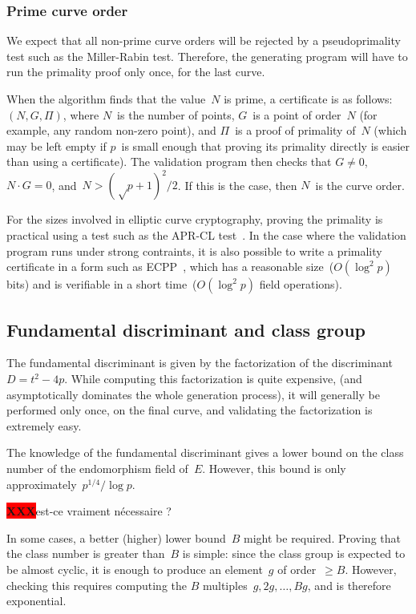 \documentclass{article}
\def\XXX{{\colorbox{red}{{\color{white}\bfseries XXX}}}}
\begin{document}
\subsubsection{Prime curve order}
We expect that all non-prime curve orders
will be rejected by a pseudoprimality test such as the Miller-Rabin test.
Therefore, the generating program will have to run the primality proof
only once, for the last curve.

When the algorithm finds that the value~$N$ is prime,
a certificate is as follows: $(N, G, Π)$,
where $N$~is the number of points,
$G$~is a point of order~$N$ (for example, any random non-zero point),
and $Π$~is a proof of primality of~$N$
(which may be left empty if $p$~is small enough
that proving its primality directly is easier than using a certificate).
The validation program then checks that $G ≠ 0$,
$N · G = 0$, and~$N > (√p+1)^2 / 2$.
If this is the case, then $N$~is the curve order.

For the sizes involved in elliptic curve cryptography,
proving the primality is practical using a test such as
the APR-CL test~\cite{fcs1980adleman,mathcomp1984cl}.
In the case where the validation program runs under strong contraints,
it is also possible to write a primality certificate
in a form such as ECPP~\cite{mathcomp1993am},
which has a reasonable size~($O(\log^2 p)$ bits)
and is verifiable in a short time~($O(\log^2 p)$ field operations).

\subsection{Fundamental discriminant and class group}

The fundamental discriminant is given by
the factorization of the discriminant~$D = t^2 - 4 p$.
While computing this factorization is quite expensive,
(and asymptotically dominates the whole generation process),
it will generally be performed only once, on the final curve,
and validating the factorization is extremely easy.

The knowledge of the fundamental discriminant gives a lower bound
on the class number of the endomorphism field of~$E$.
However, this bound is only approximately~$p^{1/4}/\log p$.

\smallskip

\XXX est-ce vraiment nécessaire ?

In some cases, a better (higher) lower bound~$B$ might be required.
Proving that the class number is greater than~$B$ is simple:
since the class group is expected to be almost cyclic,
it is enough to produce an element~$g$ of order~$≥ B$.
However, checking this requires
computing the $B$ multiples~$g, 2g, …, B g$,
and is therefore exponential.
\end{document}
